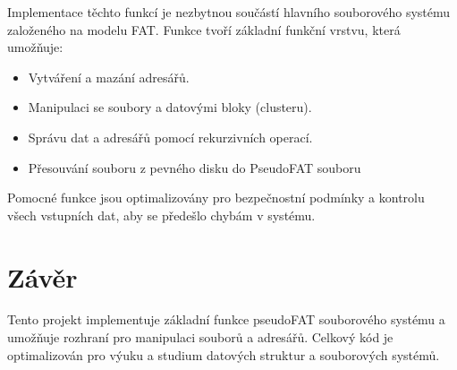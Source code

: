\documentclass[12pt]{article}
\begin{document}
Implementace těchto funkcí je nezbytnou součástí hlavního souborového systému založeného na modelu FAT. Funkce tvoří základní funkční vrstvu, která umožňuje:

\begin{itemize}
    \item Vytváření a mazání adresářů.
    \item Manipulaci se soubory a datovými bloky (clusteru).
    \item Správu dat a adresářů pomocí rekurzivních operací.
    \item Přesouvání souboru z pevného disku do PseudoFAT souboru
\end{itemize}

Pomocné funkce jsou optimalizovány pro bezpečnostní podmínky a kontrolu všech vstupních dat, aby se předešlo chybám v systému.


\section*{Závěr}
Tento projekt implementuje základní funkce pseudoFAT souborového systému a umožňuje rozhraní pro manipulaci souborů a adresářů. Celkový kód je optimalizován pro výuku a studium datových struktur a souborových systémů.
\end{document}
